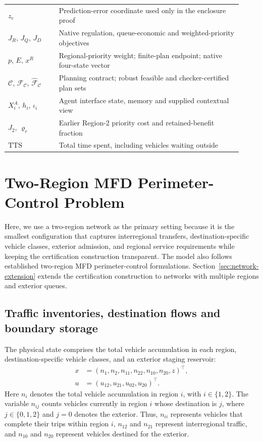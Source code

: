 \documentclass[journal,10pt]{IEEEtran}
\begin{document}
\begin{table}[!t]
\begin{tabular}{@{}p{0.20\linewidth}p{0.72\linewidth}@{}}
$z_e$ & Prediction-error coordinate used only in the enclosure proof\\
$J_R$, $J_Q$, $J_D$ & Native regulation, queue-economic and weighted-priority objectives\\
$p$, $E$, $x^R$ & Regional-priority weight; finite-plan endpoint; native four-state vector\\
$\mathcal C$, $\mathcal F_{\mathcal C}$, $\widehat{\mathcal F}_{\mathcal C}$ & Planning contract; robust feasible and checker-certified plan sets\\
$X_i^A$, $h_i$, $\iota_i$ & Agent interface state, memory and supplied contextual view\\
$J_2$, $\varrho_r$ & Earlier Region-2 priority cost and retained-benefit fraction\\
$\mathrm{TTS}$ & Total time spent, including vehicles waiting outside\\
\bottomrule
\end{tabular}
\end{table}

\FloatBarrier
\section{Two-Region MFD Perimeter-Control Problem}
\label{sec:new-problem}
Here, we use a two-region network as the primary setting because it is the smallest
configuration that captures interregional transfers, destination-specific
vehicle classes, exterior admission, and regional service requirements while
keeping the certification construction transparent. The model also follows
established two-region MFD perimeter-control formulations. Section~\ref{sec:network-extension}
extends the certification construction to networks with multiple regions and
exterior queues.


\subsection{Traffic inventories, destination flows and boundary storage}

The physical state comprises the total vehicle accumulation in each region, destination-specific vehicle classes, and an exterior staging reservoir:
\begin{equation}
\begin{aligned}
x&=(n_1,n_2,n_{11},n_{22},n_{10},n_{20},z)^\top,\\
u&=(u_{12},u_{21},u_{02},u_{20})^\top.
\end{aligned}
\label{eq:new-state}
\end{equation}
Here $n_i$ denotes the total vehicle accumulation in region $i$, with
$i\in\{1,2\}$. The variable $n_{ij}$ counts vehicles currently in region
$i$ whose destination is $j$, where $j\in\{0,1,2\}$ and $j=0$ denotes the
exterior. Thus, $n_{ii}$ represents vehicles that complete their trips
within region $i$, $n_{12}$ and $n_{21}$ represent interregional traffic,
and $n_{10}$ and $n_{20}$ represent vehicles destined for the exterior.
\end{document}
